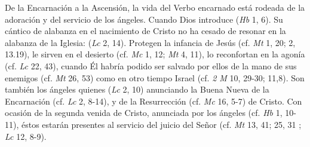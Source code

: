 	 De la Encarnación a la Ascensión, la vida del Verbo encarnado está rodeada de la adoración y del servicio de los ángeles. Cuando Dios introduce  (\emph{Hb} 1, 6). Su cántico de alabanza en el nacimiento de Cristo no ha cesado de resonar en la alabanza de la Iglesia:  (\emph{Lc} 2, 14). Protegen la infancia de Jesús (cf. \emph{Mt} 1, 20; 2, 13.19), le sirven en el desierto (cf. \emph{Mc} 1, 12; \emph{Mt} 4, 11), lo reconfortan en la agonía (cf. \emph{Lc} 22, 43), cuando Él habría podido ser salvado por ellos de la mano de sus enemigos (cf. \emph{Mt} 26, 53) como en otro tiempo Israel (cf. \emph{2 M} 10, 29-30; 11,8). Son también los ángeles quienes  (\emph{Lc} 2, 10) anunciando la Buena Nueva de la Encarnación (cf. \emph{Lc} 2, 8-14), y de la Resurrección (cf. \emph{Mc} 16, 5-7) de Cristo. Con ocasión de la segunda venida de Cristo, anunciada por los ángeles (cf. \emph{Hb} 1, 10-11), éstos estarán presentes al servicio del juicio del Señor (cf. \emph{Mt} 13, 41; 25, 31 ; \emph{Lc} 12, 8-9).